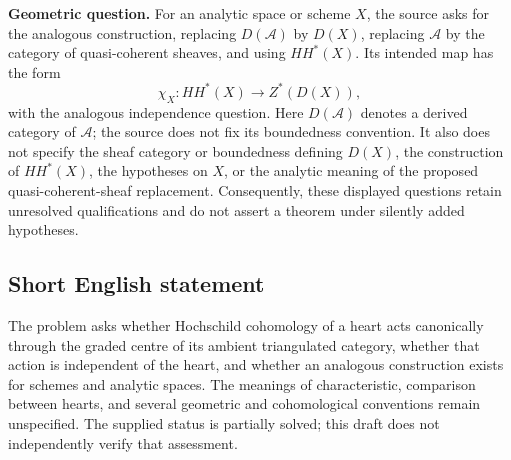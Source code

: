 \documentclass[11pt]{article}
\begin{document}
\textbf{Geometric question.} For an analytic space or scheme \(X\), the source asks for the analogous construction, replacing \(D(\mathcal A)\) by \(D(X)\), replacing \(\mathcal A\) by the category of quasi-coherent sheaves, and using \(HH^*(X)\). Its intended map has the form
\[
\chi_X:HH^*(X)\longrightarrow Z^*(D(X)),
\]
with the analogous independence question. Here \(D(\mathcal A)\) denotes a derived category of \(\mathcal A\); the source does not fix its boundedness convention. It also does not specify the sheaf category or boundedness defining \(D(X)\), the construction of \(HH^*(X)\), the hypotheses on \(X\), or the analytic meaning of the proposed quasi-coherent-sheaf replacement. Consequently, these displayed questions retain unresolved qualifications and do not assert a theorem under silently added hypotheses.
\subsection{Short English statement}
The problem asks whether Hochschild cohomology of a heart acts canonically through the graded centre of its ambient triangulated category, whether that action is independent of the heart, and whether an analogous construction exists for schemes and analytic spaces. The meanings of characteristic, comparison between hearts, and several geometric and cohomological conventions remain unspecified. The supplied status is partially solved; this draft does not independently verify that assessment.
\end{document}
